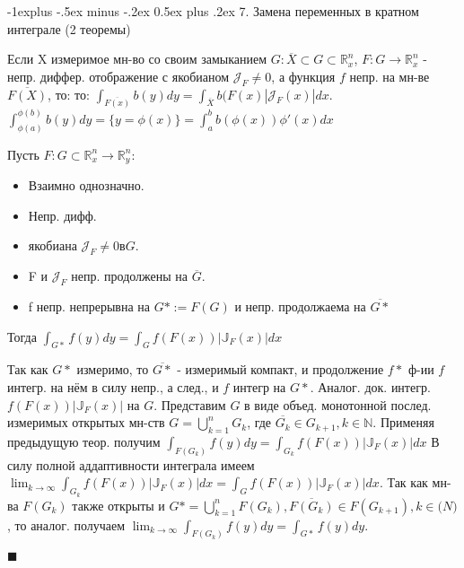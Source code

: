 \documentclass[unicode,10pt, landscape]{article}
\makeatletter
\renewcommand{\subsection}{\@startsection{subsection}{2}{0mm}%
                                {-1explus -.5ex minus -.2ex}%
                                {0.5ex plus .2ex}%
                                {\normalfont\normalsize\bfseries}}
\newenvironment{Proof} %
{\par\noindent{\bf Док-во:}} %
{\hfill$\scriptstyle\blacksquare$}
\makeatother
\begin{document}
\begin{multicols}{4}
 \subsection{7. Замена переменных в кратном интеграле (2 теоремы)}
 \begin{Th}
  Если X измеримое мн-во со своим замыканием $G: \overline{X} \subset G \subset \mathbb{R}^n_x$, $F: G \to \mathbb{R}^n_x$ - непр. диффер. отображение с якобианом $\mathcal{J}_F \neq 0$, а функция $f$ непр. на мн-ве $\overline{F(X)}$, то:
  то: $\int_{\overline{F(x)}}b(y)dy = \int_{\overline{X}}b(F(x)|\mathcal{J}_F (x)| dx$.
  $\int_{\phi(a)}^{\phi(b)}b(y)dy = \{ y = \phi(x) \} = \int_a^b b(\phi(x)) \phi'(x) dx$
 \end{Th}
 \begin{Th}
  Пусть $F: G \subset \mathbb{R}^n_x \to \mathbb{R}^n_y$:
  \begin{itemize}
   \item Взаимно однозначно.
   \item Непр. дифф.
   \item якобиана $\mathcal{J}_F \neq 0 в G$.
   \item F и $\mathcal{J}_F$ непр. продолжены на $\overline{G}$.
   \item f непр. непрерывна на $G* := F(G)$ и непр. продолжаема на $\overline{G*}$
  \end{itemize}
  Тогда $\int_{G*}f(y)dy = \int_{G}f(F(x))|\mathbb{J}_F(x)|dx$
 \end{Th}
 \begin{Proof}
  Так как $G*$ измеримо, то $\overline{G*}$ - измеримый компакт, и продолжение $f*$ ф-ии $f$ интегр. на нём в силу непр., а след., и $f$ интегр на $G*$. Аналог. док. интегр. $f(F(x))|\mathbb{J}_F(x)|$ на $G$.
  Представим $G$ в виде объед. монотонной послед. измеримых открытых мн-ств $G = \bigcup_{k=1}^{n} G_k$, где $\overline{G_k} \in G_{k+1}, k \in \mathbb{N}$. Применяя предыдущую теор. получим $\int_{F(G_k)}f(y)dy = \int_{G_k}f(F(x))|\mathbb{J}_F(x)|dx$
  В силу полной аддаптивности интеграла имеем $\lim_{k \to \infty} \int_{G_k}f(F(x))|\mathbb{J}_F(x)|dx = \int_{G}f(F(x))|\mathbb{J}_F(x)|dx$.
  Так как мн-ва $F(G_k)$ также открыты и $G* = \bigcup_{k=1}^{n} F(G_k), \overline{F(G_k)} \in F(G_{k+1}), k \in \mathbb(N)$, то аналог. получаем $\lim_{k\to\infty} \int_{F(G_k)} f(y)dy = \int_{G*} f(y)dy$.

\end{Proof}
\end{multicols}
\end{document}
